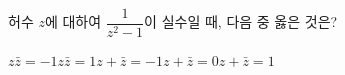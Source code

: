 허수 $z$에 대하여 $\dfrac{1}{z^2-1}$이 실수일 때, 다음 중 옳은 것은? 
\begin{choices32}{$z\bar{z}=-1$}{$z\bar{z}=1$}{$z+\bar{z}=-1$}{$z+\bar{z}=0$}{$z+\bar{z}=1$}\end{choices32}
